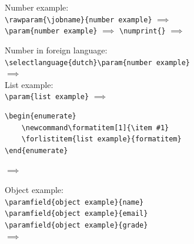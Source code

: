 \documentclass{article}
\begin{document}
    Number example:\\

    \lstinline[style=TeX,morekeywords={rawparam}]|\rawparam{\jobname}{number example}|
    $\implies$
    \\

    \lstinline[style=TeX,morekeywords={param}]|\param{number example}|
    $\implies$
    \lstinline[style=TeX,morekeywords={numprint}]|\numprint{|\verb|}|
    $\implies$
    \\

    \clearpage

    Number in foreign language:\\

    \lstinline[style=TeX,morekeywords={param,selectlanguage}]|\selectlanguage{dutch}\param{number example}|\\
    $\implies$
    \begingroup{}\endgroup\\

    List example:\\

    \lstinline[style=TeX,morekeywords={param}]|\param{list example}|
    $\implies$
    \\

    \begin{lstlisting}[language={[LaTeX]TeX},morekeywords={formatitem,forlistitem}]
\begin{enumerate}
    \newcommand\formatitem[1]{\item #1}
    \forlistitem{list example}{formatitem}
\end{enumerate}
    \end{lstlisting}
    $\implies$
    \begin{enumerate}
        \newcommand\formatitem[1]{\item #1}
    \end{enumerate}

    Object example:\\

    \lstinline[style=TeX,morekeywords={paramfield}]|\paramfield{object example}{name}|\\
    \lstinline[style=TeX,morekeywords={paramfield}]|\paramfield{object example}{email}|\\
    \lstinline[style=TeX,morekeywords={paramfield}]|\paramfield{object example}{grade}|\\
    $\implies$
    \\
\end{document}
